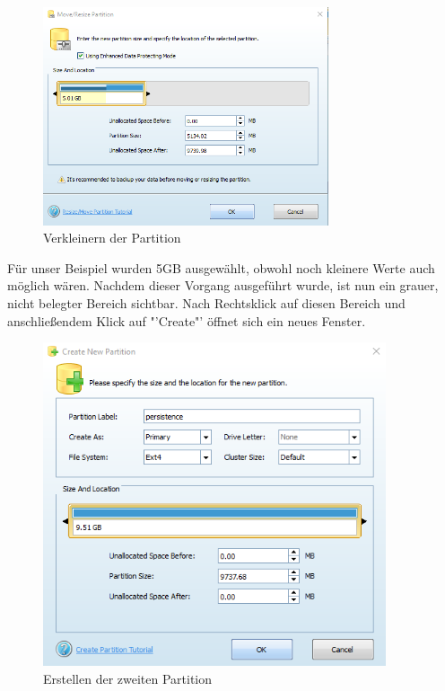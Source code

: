 	\begin{figure}[H]
		\centering
		\includegraphics[width=0.75\textwidth]{images/prep/resized_part.png}
		\caption{Verkleinern der Partition}
		\label{fig:finish resize partition }
	\end{figure} 
Für unser Beispiel wurden 5GB ausgewählt, obwohl noch kleinere Werte auch möglich wären.
Nachdem dieser Vorgang ausgeführt wurde, ist nun ein grauer, nicht belegter Bereich sichtbar.
Nach Rechtsklick auf diesen Bereich und anschließendem Klick auf "'Create"' öffnet sich ein neues Fenster.
	\begin{figure}[H]
		\centering
		\includegraphics[width=0.9\textwidth]{images/prep/create_part.png}
		\caption{Erstellen der zweiten Partition}
		\label{fig:createPartition}
	\end{figure}

